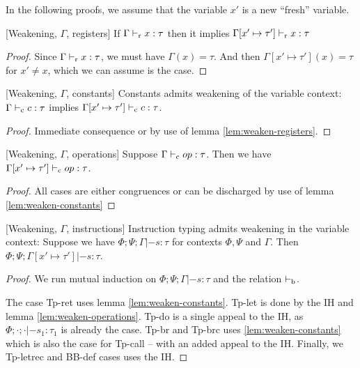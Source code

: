 \documentclass[a4paper, oneside, 10pt, draft]{memoir}
\begin{document}
In the following proofs, we assume that the variable $x'$ is a new
``fresh'' variable.
\begin{lem}{[Weakening, $\Gamma$, registers]}
  \label{lem:weaken-registers}
  If $\Gamma |-_{\mathrm{r}} x : \tau$ then it implies $\Gamma[x' \mapsto \tau']
  |-_{\mathrm{r}} x : \tau$
\end{lem}
\begin{proof}
  Since $\Gamma |-_{\mathrm{r}} x : \tau$, we must have $\Gamma(x) = \tau$. And
  then $\Gamma[x' \mapsto \tau'](x) = \tau$ for $x' \neq x$, which we
  can assume is the case.
\end{proof}
\begin{lem}{[Weakening, $\Gamma$, constants]}
  \label{lem:weaken-constants}
  Constants admits weakening of the variable context: $\Gamma |-_{\mathrm{c}} c :
  \tau$ implies $\Gamma[x' \mapsto \tau'] |-_{\mathrm{c}} c : \tau$.
\end{lem}
\begin{proof}
  Immediate consequence or by use of lemma \ref{lem:weaken-registers}.
\end{proof}
\begin{lem}{[Weakening, $\Gamma$, operations]}
  \label{lem:weaken-operations}
  Suppose $\Gamma |-_{\mathrm{c}} op : \tau$. Then we have $\Gamma[x' \mapsto
  \tau'] |-_{\mathrm{c}} op : \tau$.
\end{lem}
\begin{proof}
  All cases are either congruences or can be discharged by use of
  lemma \ref{lem:weaken-constants}
\end{proof}
\begin{lem}{[Weakening, $\Gamma$, instructions]}
  \label{lem:weaken-gamma}
  Instruction typing admits weakening in the variable context: Suppose
  we have $\Phi;\Psi;\Gamma |- s : \tau$ for contexts $\Phi, \Psi$ and
  $\Gamma$. Then $\Phi;\Psi;\Gamma[x' \mapsto \tau'] |- s : \tau$.
\end{lem}
\begin{proof}
  We run mutual induction on $\Phi;\Psi;\Gamma |- s : \tau$ and the
  relation $|-_{\mathrm{b}}$.

  The case Tp-ret uses lemma \ref{lem:weaken-constants}. Tp-let is
  done by the IH and lemma \ref{lem:weaken-operations}. Tp-do is a
  single appeal to the IH, as $\Phi;\cdot;\cdot |- s_1 : \tau_1$ is
  already the case. Tp-br and Tp-brc uses \ref{lem:weaken-constants}
  which is also the case for Tp-call -- with an added appeal to the
  IH. Finally, we Tp-letrec and BB-def cases uses the IH.
\end{proof}
\end{document}
